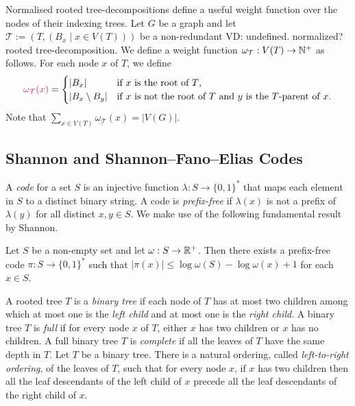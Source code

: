 \documentclass{patmorin}
\makeatletter
\renewcommand{\le}{\leqslant}
\newcommand{\vida}[1]{{\color{pink} VD: #1}}
\newcommand{\pat}[1]{\textcolor{Magenta}{PaMo: #1}}
\newcommand{\gwen}[1]{\textcolor{Purple}{GJ: #1}}
\newcommand{\defin}[1]{\emph{\textcolor{brightmaroon}{#1}}}
\def\mathcolor#1#{\@mathcolor{#1}}
\def\@mathcolor#1#2#3{%
  \protect\leavevmode
  \begingroup
    \color#1{#2}#3%
  \endgroup
}
\newcommand{\mathdefin}[1]{\mathcolor{brightmaroon}{#1}}
\makeatother
\begin{document}

  Normalised rooted tree-decompositions define a useful weight function over the nodes of their indexing trees.
  Let $G$ be a graph and let $\mathcal{T}:=(T,(B_x \mid x\in V(T)))$ be a non-redundant\vida{undefined. normalized?} rooted tree-decomposition.
    We define a weight function $\omega_\mathcal{T}:V(T)\to \mathbb{N}^+$ as follows.
      For each node $x$ of $T$, we define
  \[
      \mathdefin{\omega_{\mathcal{T}}(x)}=\begin{cases}
      |B_x|&\textrm{if $x$ is the root of $T$,}\\
      |B_x\setminus B_y|&\textrm{if $x$ is not the root of $T$ and $y$ is the $T$-parent of $x$.}
      \end{cases}
  \]
  Note that $\sum_{x\in V(T)}\omega_\mathcal{T}(x)=|V(G)|$.

  \subsection{Shannon and Shannon--Fano--Elias Codes}

  A \defin{code} for a set $S$ is an injective function $\lambda:S\to\{0,1\}^*$ that maps each element in $S$ to a distinct binary string.  A code is \defin{prefix-free} if $\lambda(x)$ is not a prefix of $\lambda(y)$ for all distinct $x,y\in S$.
  We make use of the following fundamental result by Shannon.

  \begin{lem}
  \label{shannon_code}
    Let $S$ be a non-empty set and let $\omega:S\to\mathbb{R}^+$.  Then there exists a prefix-free code $\pi:S\to\{0,1\}^*$ such that $|\pi(x)|\le \log\omega(S)-\log\omega(x)+1$ for each $x\in S$.
  \end{lem}

  A rooted tree $T$ is a \defin{binary tree} if each node of $T$ has at most two children among which at most one is the \defin{left child} and at most one is the \defin{right child}.
  A binary tree $T$ is \defin{full} if for every node $x$ of $T$,
  either $x$ has two children or $x$ has no children.
  A full binary tree $T$ is \defin{complete} if all the leaves of $T$ have the same depth in $T$.
  Let $T$ be a binary tree. There is a natural ordering, called \defin{left-to-right ordering}, of the leaves of $T$, such that for every node $x$, if $x$ has two children then all the leaf descendants of the left child of $x$ precede all the leaf descendants of the right child of $x$.
\end{document}
